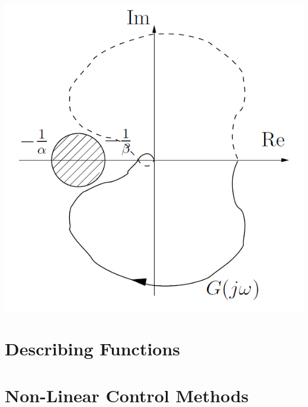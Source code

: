 \begin{minipage}{5cm}
    \centering
    \includegraphics[width=\linewidth]{bilder/nonlinear_circle.png}
\end{minipage}

\section{Describing Functions}

\section{Non-Linear Control Methods}
